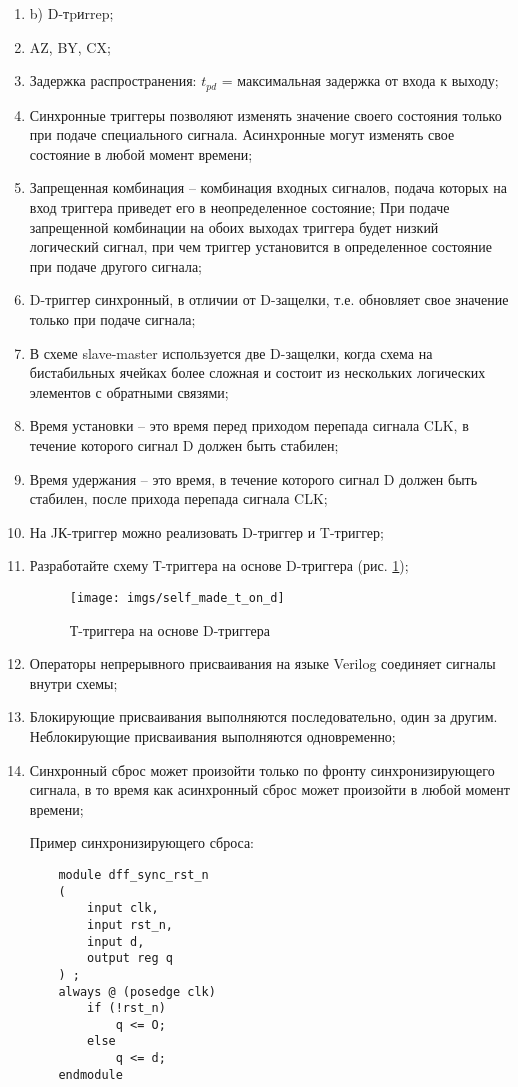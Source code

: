 \documentclass[a4paper,14pt]{article}
\begin{document}
\begin{enumerate}
	\item b) D-тpиrrep;
	\item AZ, BY, CX;
	\item Задержка распространения: $t_{pd}$ = максимальная задержка от входа к выходу;
	\item Синхронные триггеры позволяют изменять значение своего состояния только при подаче специального сигнала.
	Асинхронные могут изменять свое состояние в любой момент времени;
	\item Запрещенная комбинация -- комбинация входных сигналов, подача которых на вход триггера приведет его в неопределенное состояние;
	При подаче запрещенной комбинации на обоих выходах триггера будет низкий логический сигнал, при чем триггер установится в определенное состояние при подаче другого сигнала;
	\item D-триггер синхронный, в отличии от D-защелки, т.е. обновляет свое значение только при подаче сигнала;
	\item В схеме slave-master используется две D-защелки, когда схема на бистабильных ячейках более сложная и состоит из нескольких логических элементов с обратными связями;
	\item Время установки -- это время перед приходом перепада сигнала CLK, в течение которого сигнал D должен быть стабилен;
	\item Время удержания -- это время, в течение которого сигнал D должен быть стабилен, после прихода перепада сигнала CLK;
	\item На JК-триггер можно реализовать D-триггер и T-триггер;
	\item Разработайте схему Т-триггера на основе D-триггера (рис. \ref{fig:self_made_t_on_d});
	\begin{figure}[H]
		\centering
		\texttt{[image: imgs/self\_made\_t\_on\_d]}
		\caption{Т-триггера на основе D-триггера}
		\label{fig:self_made_t_on_d}
	\end{figure}
	\item Операторы непрерывного присваивания на языке Verilog соединяет сигналы внутри схемы;
	\item Блокирующие присваивания выполняются последовательно, один за другим.
	Неблокирующие присваивания выполняются одновременно;
	\item Синхронный сброс может произойти только по фронту синхронизирующего сигнала, в то время как асинхронный сброс может произойти в любой момент времени;

	Пример синхронизирующего сброса:
	\begin{verbatim}
	module dff_sync_rst_n
	(	
		input clk,
		input rst_n,
		input d,
		output reg q
	) ;
	always @ (posedge clk)
		if (!rst_n)
			q <= О;
		else
			q <= d;
	endmodule
	\end{verbatim}
	

\end{enumerate}
\end{document}
